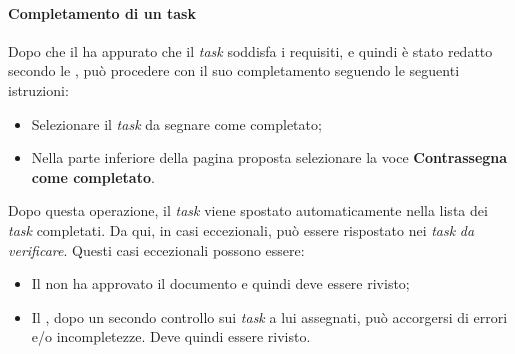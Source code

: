 \paragraph{Completamento di un task}
Dopo che il \textit{\Ver} ha appurato che il \textit{task} soddisfa i requisiti, e quindi è stato redatto secondo le
\textsl{\NdP}, può procedere con il suo completamento seguendo le seguenti istruzioni:
\begin{itemize}
  \item Selezionare il \textit{task} da segnare come completato;
  \item Nella parte inferiore della pagina proposta selezionare la voce \textbf{Contrassegna come 
  completato}.
\end{itemize}
Dopo questa operazione, il \textit{task} viene spostato automaticamente nella lista dei \textit{task} completati. Da qui, in
casi eccezionali, può essere rispostato nei \textit{task} \textsl{da verificare}. Questi casi eccezionali possono essere:
\begin{itemize}
  \item Il \textsl{\RdP} non ha approvato il documento e quindi deve essere 
  rivisto;
  \item Il \textsl{\Ver}, dopo un secondo controllo sui \textit{task} a lui assegnati, 
  può accorgersi di errori e/o incompletezze. Deve quindi essere rivisto.
\end{itemize}